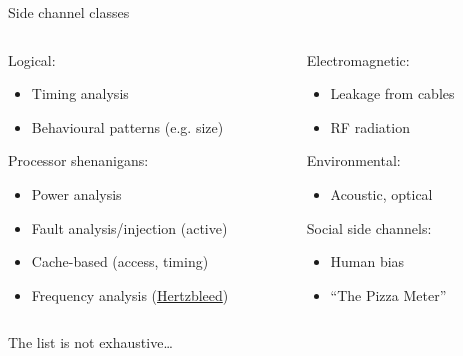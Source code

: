 \begin{frame}{Side channel classes}
  \begin{columns}[T,onlytextwidth]
    \begin{column}{0.5\textwidth}
      \pause
      Logical:
      \begin{itemize}[<+(1)->]
        \item Timing analysis
        \item Behavioural patterns (e.g. size)
      \end{itemize}

      \pause
      Processor shenanigans:
      \begin{itemize}[<+(1)->]
        \item Power analysis
        \item Fault analysis/injection (active)
        \item Cache-based (access, timing)
        \item Frequency analysis (\href{https://www.hertzbleed.com}{Hertzbleed})
      \end{itemize}
      \end{column}
    \begin{column}{0.4\textwidth}
      \pause
      Electromagnetic:
      \begin{itemize}[<+(1)->]
        \item Leakage from cables
        \item RF radiation
      \end{itemize}

      \pause
      Environmental:
      \begin{itemize}[<+(1)->]
        \item Acoustic, optical
      \end{itemize}

      \pause
      Social side channels:
      \begin{itemize}[<+(1)->]
        \item Human bias
        \item \enquote{The Pizza Meter}
      \end{itemize}
    \end{column}
  \end{columns}

  \vspace*{2em}

  \pause
  The list is not exhaustive\dots
\end{frame}

